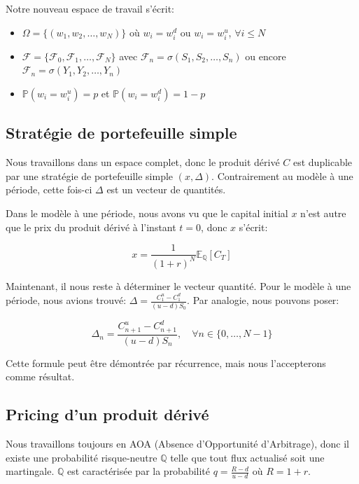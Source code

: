 \documentclass[12pt,a4paper]{report}
\begin{document}
Notre nouveau espace de travail s'écrit:
\begin{itemize}
    \item $\Omega = \{(w_1, w_2, \ldots, w_N)\}$ où $w_i = w_i^d$ ou $w_i = w_i^u$, $\forall i \leq N$
    \item $\mathcal{F} = \{\mathcal{F}_0, \mathcal{F}_1, \ldots, \mathcal{F}_N\}$ avec $\mathcal{F}_n = \sigma(S_1, S_2, \ldots, S_n)$ ou encore $\mathcal{F}_n = \sigma(Y_1, Y_2, \ldots, Y_n)$
    \item $\mathbb{P}(w_i = w_i^u) = p$ et $\mathbb{P}(w_i = w_i^d) = 1 - p$
\end{itemize}

\subsection{Stratégie de portefeuille simple}

Nous travaillons dans un espace complet, donc le produit dérivé $C$ est duplicable par une stratégie de portefeuille simple $(x, \Delta)$. Contrairement au modèle à une période, cette fois-ci $\Delta$ est un vecteur de quantités.

Dans le modèle à une période, nous avons vu que le capital initial $x$ n'est autre que le prix du produit dérivé à l'instant $t=0$, donc $x$ s'écrit:

\begin{equation*}
x = \frac{1}{(1 + r)^N} \mathbb{E}_{\mathbb{Q}} [C_T]
\end{equation*}

Maintenant, il nous reste à déterminer le vecteur quantité. Pour le modèle à une période, nous avions trouvé: $\Delta = \frac{C_1^u - C_1^d}{(u - d)S_0}$. Par analogie, nous pouvons poser:

\begin{equation*}
\Delta_n = \frac{C_{n+1}^u - C_{n+1}^d}{(u - d)S_n}, \quad \forall n \in \{0, \ldots, N-1\}
\end{equation*}

Cette formule peut être démontrée par récurrence, mais nous l'accepterons comme résultat.

\subsection{Pricing d'un produit dérivé}

Nous travaillons toujours en AOA (Absence d'Opportunité d'Arbitrage), donc il existe une probabilité risque-neutre $\mathbb{Q}$ telle que tout flux actualisé soit une martingale. $\mathbb{Q}$ est caractérisée par la probabilité $q = \frac{R-d}{u-d}$ où $R = 1+r$. 
\end{document}
